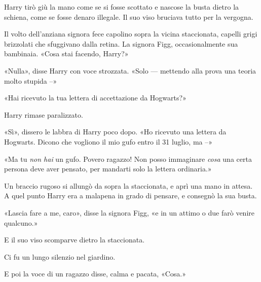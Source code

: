 Harry tirò giù la mano come se si fosse scottato e nascose la busta dietro la schiena, come se fosse denaro illegale. Il suo viso bruciava tutto per la vergogna.

Il volto dell’anziana signora fece capolino sopra la vicina staccionata, capelli grigi brizzolati che sfuggivano dalla retina. La signora Figg, occasionalmente sua bambinaia. «Cosa stai facendo, Harry?»

«Nulla», disse Harry con voce strozzata. «Solo — mettendo alla prova una teoria molto stupida –»

«Hai ricevuto la tua lettera di accettazione da Hogwarts?»

Harry rimase paralizzato.

«Sì», dissero le labbra di Harry poco dopo. «Ho ricevuto una lettera da Hogwarts. Dicono che vogliono il mio gufo entro il 31 luglio, ma –»

«Ma tu \emph{non hai} un gufo. Povero ragazzo! Non posso immaginare \emph{cosa} una certa persona deve aver pensato, per mandarti solo la lettera ordinaria.»

Un braccio rugoso si allungò da sopra la staccionata, e aprì una mano in attesa. A quel punto Harry era a malapena in grado di pensare, e consegnò la sua busta.

«Lascia fare a me, caro», disse la signora Figg, «e in un attimo o due farò venire qualcuno.»

E il suo viso scomparve dietro la staccionata.

Ci fu un lungo silenzio nel giardino.

E poi la voce di un ragazzo disse, calma e pacata, «Cosa.»
